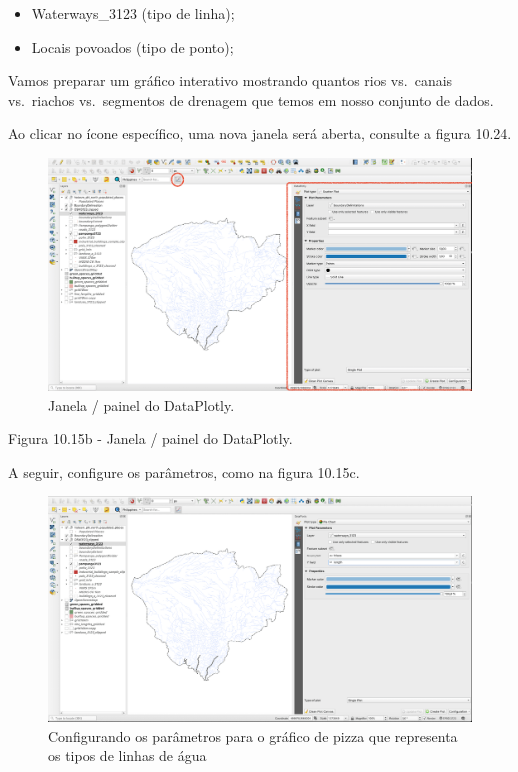 \documentclass[
]{krantz}
\providecommand{\tightlist}{%
  \setlength{\itemsep}{0pt}\setlength{\parskip}{0pt}}
\begin{document}
\begin{itemize}
\tightlist
\item
  Waterways\_3123 (tipo de linha);
\item
  Locais povoados (tipo de ponto);
\end{itemize}

Vamos preparar um gráfico interativo mostrando quantos rios vs.~canais vs.~riachos vs.~segmentos de drenagem que temos em nosso conjunto de dados.

Ao clicar no ícone específico, uma nova janela será aberta, consulte a figura 10.24.

\begin{figure}
\centering
\includegraphics{media/modulo10/fig1015_b.png}
\caption{Janela / painel do DataPlotly.}
\end{figure}

Figura 10.15b - Janela / painel do DataPlotly.

A seguir, configure os parâmetros, como na figura 10.15c.

\begin{figure}
\centering
\includegraphics{media/modulo10/fig1015_c.png}
\caption{Configurando os parâmetros para o gráfico de pizza que representa os tipos de linhas de água}
\end{figure}
\end{document}
